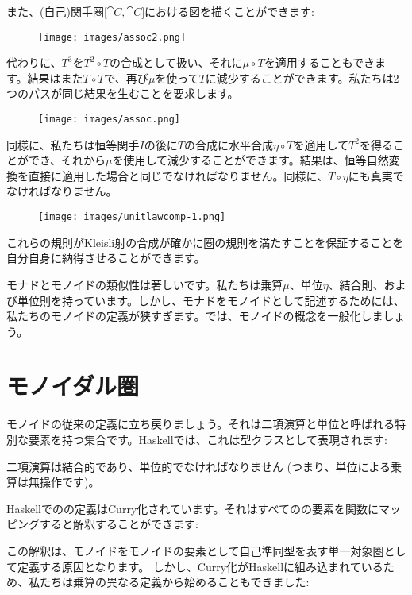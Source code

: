 \noindent
また、(自己)関手圏${[}\cat{C}, \cat{C}{]}$における図を描くことができます: 

\begin{figure}[H]
  \centering
  \texttt{[image: images/assoc2.png]}
\end{figure}

\noindent
代わりに、$T^3$を$T^2 \circ T$の合成として扱い、それに$\mu \circ T$を適用することもできます。結果はまた$T \circ T$で、再び$\mu$を使って$T$に減少することができます。私たちは2つのパスが同じ結果を生むことを要求します。

\begin{figure}[H]
  \centering
  \texttt{[image: images/assoc.png]}
\end{figure}

\noindent
同様に、私たちは恒等関手$I$の後に$T$の合成に水平合成$\eta \circ T$を適用して$T^2$を得ることができ、それから$\mu$を使用して減少することができます。結果は、恒等自然変換を直接に適用した場合と同じでなければなりません。同様に、$T \circ \eta$にも真実でなければなりません。

\begin{figure}[H]
  \centering
  \texttt{[image: images/unitlawcomp-1.png]}
\end{figure}

\noindent
これらの規則がKleisli射の合成が確かに圏の規則を満たすことを保証することを自分自身に納得させることができます。

モナドとモノイドの類似性は著しいです。私たちは乗算$\mu$、単位$\eta$、結合則、および単位則を持っています。しかし、モナドをモノイドとして記述するためには、私たちのモノイドの定義が狭すぎます。では、モノイドの概念を一般化しましょう。

\section{モノイダル圏}

モノイドの従来の定義に立ち戻りましょう。それは二項演算と単位と呼ばれる特別な要素を持つ集合です。Haskellでは、これは型クラスとして表現されます: 

二項演算は結合的であり、単位的でなければなりません (つまり、単位による乗算は無操作です)。

Haskellでのの定義はCurry化されています。それはすべてのの要素を関数にマッピングすると解釈することができます: 

この解釈は、モノイドをモノイドの要素として自己準同型を表す単一対象圏として定義する原因となります。
しかし、Curry化がHaskellに組み込まれているため、私たちは乗算の異なる定義から始めることもできました: 

